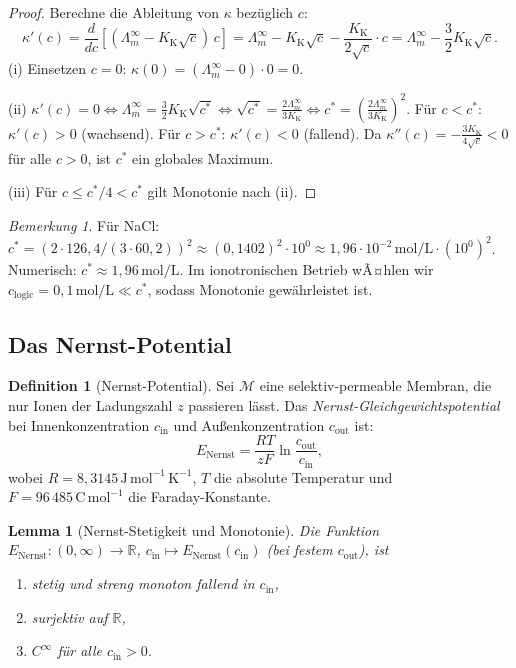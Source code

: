 ﻿\documentclass[a4paper,12pt]{article}
\theoremstyle{plain}
\newtheorem{lemma}{Lemma}
\theoremstyle{definition}
\newtheorem{definition}{Definition}
\theoremstyle{remark}
\newtheorem{bemerkung}{Bemerkung}
\begin{document}
\begin{proof}
Berechne die Ableitung von $\kappa$ bez\"uglich $c$:
\[
\kappa'(c) = \frac{d}{dc}\!\left[(\Lambda_m^\infty - K_{\mathrm{K}}\sqrt{c})\,c\right]
= \Lambda_m^\infty - K_{\mathrm{K}}\sqrt{c} - \frac{K_{\mathrm{K}}}{2\sqrt{c}}\cdot c
= \Lambda_m^\infty - \frac{3}{2}K_{\mathrm{K}}\sqrt{c}.
\]
(i) Einsetzen $c=0$: $\kappa(0) = (\Lambda_m^\infty - 0)\cdot 0 = 0$. \checkmark

(ii) $\kappa'(c) = 0 \Leftrightarrow \Lambda_m^\infty = \frac{3}{2}K_{\mathrm{K}}\sqrt{c^*}
\Leftrightarrow \sqrt{c^*} = \frac{2\Lambda_m^\infty}{3K_{\mathrm{K}}}
\Leftrightarrow c^* = \left(\frac{2\Lambda_m^\infty}{3K_{\mathrm{K}}}\right)^2$.
F\"ur $c < c^*$: $\kappa'(c) > 0$ (wachsend).
F\"ur $c > c^*$: $\kappa'(c) < 0$ (fallend).
Da $\kappa''(c) = -\frac{3K_{\mathrm{K}}}{4\sqrt{c}} < 0$ f\"ur alle $c > 0$,
ist $c^*$ ein globales Maximum.

(iii) F\"ur $c \leq c^*/4 < c^*$ gilt Monotonie nach (ii). \checkmark
\end{proof}

\begin{bemerkung}
F\"ur NaCl: $c^* = (2\cdot 126{,}4/(3\cdot 60{,}2))^2 \approx (0{,}1402)^2 \cdot 10^0
\approx 1{,}96 \cdot 10^{-2}\,\mathrm{mol/L}\cdot (10^0)^2$.
Numerisch: $c^* \approx 1{,}96\,\mathrm{mol/L}$.
Im ionotronischen Betrieb wÃ¤hlen wir $c_{\mathrm{logic}} = 0{,}1\,\mathrm{mol/L}
\ll c^*$, sodass Monotonie gew\"ahrleistet ist.
\end{bemerkung}

\subsection{Das Nernst-Potential}

\begin{definition}[Nernst-Potential]
\label{def:nernst}
Sei $\mathcal{M}$ eine selektiv-permeable Membran, die nur Ionen der
Ladungszahl $z$ passieren l\"asst.
Das \emph{Nernst-Gleichgewichtspotential} bei Innenkonzentration
$c_{\mathrm{in}}$ und Au{\ss}enkonzentration $c_{\mathrm{out}}$ ist:
\[
E_{\mathrm{Nernst}} = \frac{RT}{zF}\ln\frac{c_{\mathrm{out}}}{c_{\mathrm{in}}},
\]
wobei $R = 8{,}3145\,\mathrm{J\,mol^{-1}\,K^{-1}}$, $T$ die absolute Temperatur
und $F = 96\,485\,\mathrm{C\,mol^{-1}}$ die Faraday-Konstante.
\end{definition}

\begin{lemma}[Nernst-Stetigkeit und Monotonie]
\label{lem:nernst_prop}
Die Funktion $E_{\mathrm{Nernst}}: (0,\infty) \to \mathbb{R}$,
$c_{\mathrm{in}} \mapsto E_{\mathrm{Nernst}}(c_{\mathrm{in}})$
(bei festem $c_{\mathrm{out}}$), ist
\begin{enumerate}[label=(\roman*)]
    \item stetig und streng monoton fallend in $c_{\mathrm{in}}$,
    \item surjektiv auf $\mathbb{R}$,
    \item $C^\infty$ f\"ur alle $c_{\mathrm{in}} > 0$.
\end{enumerate}
\end{lemma}
\end{document}
